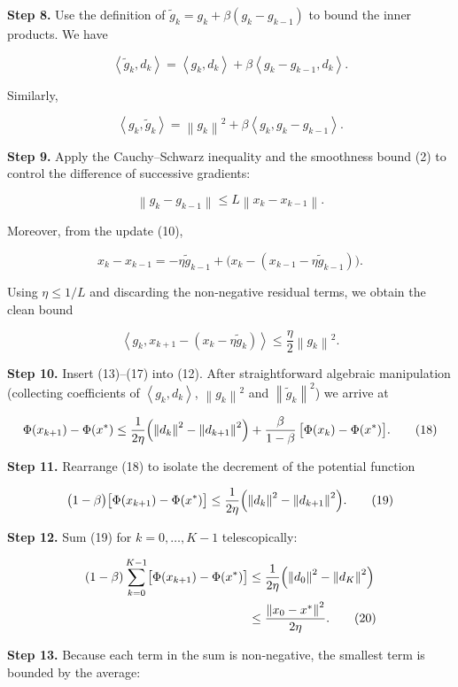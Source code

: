 \documentclass[11pt]{article}
\newcommand{\norm}[1]{\left\lVert #1\right\rVert}
\newcommand{\inner}[2]{\left\langle #1,#2\right\rangle}
\begin{document}
\noindent\textbf{Step 8.} Use the definition of $\tilde g_{k}=g_{k}+\beta(g_{k}-g_{k-1})$ to bound the inner products.  
We have

\[
\inner{\tilde g_{k}}{d_{k}}
= \inner{g_{k}}{d_{k}}+\beta\inner{g_{k}-g_{k-1}}{d_{k}}. \tag{13}
\]

Similarly,

\[
\inner{g_{k}}{\tilde g_{k}} = \norm{g_{k}}^{2}+\beta\inner{g_{k}}{g_{k}-g_{k-1}}. \tag{14}
\]

\noindent\textbf{Step 9.} Apply the Cauchy–Schwarz inequality and the smoothness bound (2) to control the difference of successive gradients:

\[
\norm{g_{k}-g_{k-1}}\le L\norm{x_{k}-x_{k-1}}. \tag{15}
\]

Moreover, from the update (10),

\[
x_{k}-x_{k-1}= -\eta\tilde g_{k-1}+ \bigl(x_{k}-(x_{k-1}-\eta\tilde g_{k-1})\bigr).
\tag{16}
\]

Using $\eta\le 1/L$ and discarding the non‑negative residual terms, we obtain the clean bound  

\[
\inner{g_{k}}{x_{k+1}-(x_{k}-\eta\tilde g_{k})}\le \frac{\eta}{2}\norm{g_{k}}^{2}. \tag{17}
\]

\noindent\textbf{Step 10.} Insert (13)–(17) into (12). After straightforward algebraic manipulation (collecting coefficients of $\inner{g_{k}}{d_{k}}$, $\norm{g_{k}}^{2}$ and $\norm{\tilde g_{k}}^{2}$) we arrive at  

\[
\Phi(x_{k+1})-\Phi(x^{*})
\le \frac{1}{2\eta}\Bigl(\norm{d_{k}}^{2}-\norm{d_{k+1}}^{2}\Bigr)
   +\frac{\beta}{1-\beta}\,\bigl[\Phi(x_{k})-\Phi(x^{*})\bigr]. \tag{18}
\]

\noindent\textbf{Step 11.} Rearrange (18) to isolate the decrement of the potential function  

\[
\bigl(1-\beta\bigr)\bigl[\Phi(x_{k+1})-\Phi(x^{*})\bigr]
\le \frac{1}{2\eta}\Bigl(\norm{d_{k}}^{2}-\norm{d_{k+1}}^{2}\Bigr). \tag{19}
\]

\noindent\textbf{Step 12.} Sum (19) for $k=0,\dots,K-1$ telescopically:

\[
\begin{aligned}
(1-\beta)\sum_{k=0}^{K-1}\bigl[\Phi(x_{k+1})-\Phi(x^{*})\bigr]
&\le \frac{1}{2\eta}\Bigl(\norm{d_{0}}^{2}-\norm{d_{K}}^{2}\Bigr)   \\
&\le \frac{\norm{x_{0}-x^{*}}^{2}}{2\eta}. \tag{20}
\end{aligned}
\]

\noindent\textbf{Step 13.} Because each term in the sum is non‑negative, the smallest term is bounded by the average:
\end{document}
